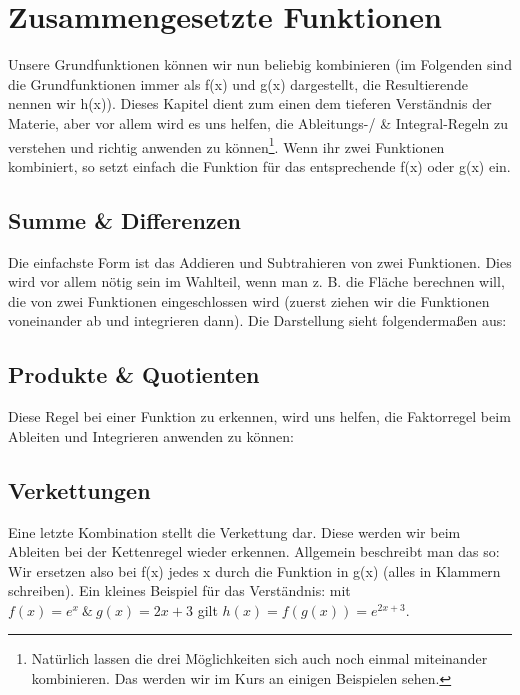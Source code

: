 \section{Zusammengesetzte Funktionen}
	Unsere Grundfunktionen können wir nun beliebig kombinieren (im Folgenden sind
	die Grundfunktionen immer als f(x) und g(x) dargestellt, die Resultierende
	nennen wir h(x)). Dieses Kapitel dient zum einen dem tieferen Verständnis der
	Materie, aber vor allem wird es uns helfen, die Ableitungs-/ \& Integral-Regeln
	zu verstehen und richtig anwenden zu können\footnote{Natürlich lassen die drei
	Möglichkeiten sich auch noch einmal miteinander kombinieren. Das werden wir im
	Kurs an einigen Beispielen sehen.}. Wenn ihr zwei Funktionen kombiniert, so
	setzt einfach die Funktion für das entsprechende f(x) oder g(x) ein.

	\subsection{Summe \& Differenzen}
		Die einfachste Form ist das Addieren und Subtrahieren von zwei Funktionen.
		Dies wird vor allem nötig sein im Wahlteil, wenn man z. B. die Fläche
		berechnen will, die von zwei Funktionen eingeschlossen wird (zuerst ziehen wir
		die Funktionen voneinander ab und integrieren dann). Die Darstellung sieht
		folgendermaßen aus:
		\formel{\[h_1(x)=f(x)+g(x), \mathrm{\ bzw\ } h_2(x)=f(x)-g(x)\]}
		
	
	\subsection{Produkte \& Quotienten}
		Diese Regel bei einer Funktion zu erkennen, wird uns helfen, die Faktorregel
		beim Ableiten und Integrieren anwenden zu können:
		\formel{\[h_1(x)=f(x)\cdot g(x), \mathrm{\ bzw\ } h_2(x)=\frac{f(x)}{g(x)}\]}
		

	\subsection{Verkettungen}
		Eine letzte Kombination stellt die Verkettung dar. Diese werden wir beim
		Ableiten bei der Kettenregel wieder erkennen. Allgemein beschreibt man das so:
		\formel{\[h(x)=f(g(x))\]}
		Wir ersetzen also bei f(x) jedes x durch die Funktion in g(x) (alles in
		Klammern schreiben). Ein kleines Beispiel für das Verständnis: mit \(f(x)=e^x\
		\&\ g(x)=2x+3\) gilt \(h(x)=f(g(x))=e^{2x+3}\).
		
